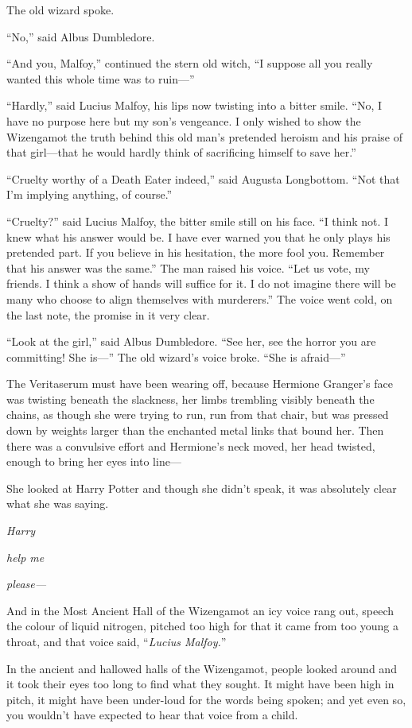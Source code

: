 The old wizard spoke.

“No,” said Albus Dumbledore.

“And you, Malfoy,” continued the stern old witch, “I suppose all you really wanted this whole time was to ruin—”

“Hardly,” said Lucius Malfoy, his lips now twisting into a bitter smile. “No, I have no purpose here but my son’s vengeance. I only wished to show the Wizengamot the truth behind this old man’s pretended heroism and his praise of that girl—that he would hardly think of sacrificing himself to save her.”

“Cruelty worthy of a Death Eater indeed,” said Augusta Longbottom. “Not that I’m implying anything, of course.”

“Cruelty?” said Lucius Malfoy, the bitter smile still on his face. “I think not. I knew what his answer would be. I have ever warned you that he only plays his pretended part. If you believe in his hesitation, the more fool you. Remember that his answer was the same.” The man raised his voice. “Let us vote, my friends. I think a show of hands will suffice for it. I do not imagine there will be many who choose to align themselves with murderers.” The voice went cold, on the last note, the promise in it very clear.

“Look at the girl,” said Albus Dumbledore. “See her, see the horror you are committing! She is—” The old wizard’s voice broke. “She is afraid—”

The Veritaserum must have been wearing off, because Hermione Granger’s face was twisting beneath the slackness, her limbs trembling visibly beneath the chains, as though she were trying to run, run from that chair, but was pressed down by weights larger than the enchanted metal links that bound her. Then there was a convulsive effort and Hermione’s neck moved, her head twisted, enough to bring her eyes into line—

She looked at Harry Potter and though she didn’t speak, it was absolutely clear what she was saying.

\emph{Harry}

\emph{help me}

\emph{please—}

And in the Most Ancient Hall of the Wizengamot an icy voice rang out, speech the colour of liquid nitrogen, pitched too high for that it came from too young a throat, and that voice said, “\emph{Lucius Malfoy.}”

\later

In the ancient and hallowed halls of the Wizengamot, people looked around and it took their eyes too long to find what they sought. It might have been high in pitch, it might have been under-loud for the words being spoken; and yet even so, you wouldn’t have expected to hear that voice from a child.

